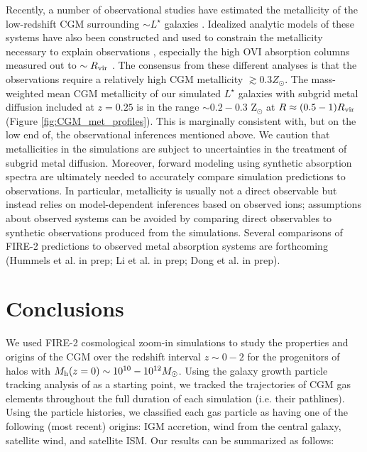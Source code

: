 \documentclass[fleqn,usenatbib]{mnras}
\begin{document}
Recently, a number of observational studies have estimated the metallicity of the low-redshift CGM surrounding $\sim L^{\star}$ galaxies \citep[e.g.,][]{Stern2016,Prochaska2017,Bregman2018}.
Idealized analytic models of these systems have also been constructed and used to constrain the metallicity necessary to explain observations \citep[][]{Faerman2017,McQuinn2017,Mathews2017,Stern2018,Voit2018a}, especially the high OVI absorption columns measured out to $\sim R_{\rm vir}$ \citep{Tumlinson2011, Johnson2015}. 
The consensus from these different analyses is that the observations require a relatively high CGM metallicity $\gtrsim 0.3 Z_{\odot}$.
The mass-weighted mean CGM metallicity of our simulated $L^\star$ galaxies with subgrid metal diffusion included at $z=0.25$ is in the range $\sim0.2-0.3$ Z$_{\odot}$ at $R\approx (0.5-1)R_{\rm vir}$ (Figure \ref{fig:CGM_met_profiles}). 
This is marginally consistent with, but on the low end of, the observational inferences mentioned above. 
We caution that metallicities in the simulations are subject to uncertainties in the treatment of subgrid metal diffusion. 
Moreover, forward modeling using synthetic absorption spectra are ultimately needed to accurately compare simulation predictions to observations. 
In particular, metallicity is usually not a direct observable but instead relies on model-dependent inferences based on observed ions; assumptions about observed systems can be avoided by comparing direct observables to synthetic observations produced from the simulations. 
Several comparisons of FIRE-2 predictions to observed metal absorption systems are forthcoming (Hummels et al. in prep; Li et al. in prep; Dong et al. in prep).

\section{Conclusions}
\label{sec:conclusions}

We used FIRE-2 cosmological zoom-in simulations to study the properties and origins of the CGM over the redshift interval $z\sim0-2$ for the progenitors of halos with $M_{\rm h}(z=0) \sim 10^{10} - 10^{12} M_\odot$.
Using the galaxy growth particle tracking analysis of \cite{Angles-Alcazar2017} as a starting point, we tracked the trajectories of CGM gas elements throughout the full duration of each simulation (i.e. their pathlines).
Using the particle histories, we classified each gas particle as having one of the following (most recent) origins: IGM accretion, wind from the central galaxy, satellite wind, and satellite ISM.
Our results can be summarized as follows:
\end{document}
